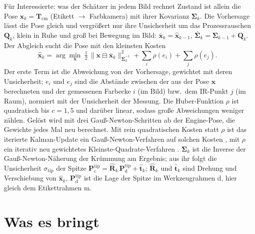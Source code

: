\documentclass[11pt,a4paper,fleqn]{article}
\newcommand{\Tcm}{\mathbf{T}_{\mathrm{cm}}}
\newcommand{\Ptd}{\mathbf{P}^{\mathrm{tip}}_{\mathrm{d}}}
\newcommand{\Ptc}{\mathbf{P}^{\mathrm{tip}}_{\mathrm{c}}}
\newcommand{\stip}{\sigma_{\mathrm{tip}}}
\newcommand{\xb}{\bar{\mathbf{x}}_k}
\newcommand{\xh}{\hat{\mathbf{x}}}
\newcommand{\Sb}{\bar{\boldsymbol{\Sigma}}_k}
\begin{document}
\begin{mybox}{Für Interessierte: was der Schätzer in jedem Bild rechnet}
Zustand ist allein die Pose $\mathbf{x}_k = \Tcm$ (Etikett $\to$ Farbkamera) mit ihrer Kovarianz
$\boldsymbol{\Sigma}_k$. Die Vorhersage
lässt die Pose gleich und vergrößert nur ihre Unsicherheit um das Prozessrauschen $\mathbf{Q}_k$, klein in Ruhe
und groß bei Bewegung im Bild: $\xb = \xh_{k-1}$, $\Sb = \boldsymbol{\Sigma}_{k-1} + \mathbf{Q}_k$. Der Abgleich
sucht die Pose mit den kleinsten Kosten
\begin{equation*}
  \xh_k = \arg\min_{\mathbf{x}}\;
  \tfrac12\,\bigl\lVert \mathbf{x} \boxminus \xb \bigr\rVert^2_{\Sb^{-1}}
  + \sum_i \rho(e_i) + \sum_j \rho(e_j) .
\end{equation*}
Der erste Term ist die Abweichung von der Vorhersage, gewichtet mit deren Unsicherheit; $e_i$ und $e_j$ sind die
Abstände zwischen der aus der Pose $\mathbf{x}$ berechneten und der gemessenen Farbecke $i$ (im Bild) bzw.\ dem
IR-Punkt $j$ (im Raum), normiert mit der Unsicherheit der Messung. Die Huber-Funktion $\rho$ ist quadratisch bis
$c = 1{,}5$ und darüber linear, sodass große Abweichungen weniger zählen. Gelöst wird mit drei
Gauß-Newton-Schritten ab der Engine-Pose, die Gewichte jedes Mal neu berechnet. Mit rein quadratischen Kosten
statt $\rho$ ist das iterierte Kalman-Update ein Gauß-Newton-Verfahren auf solchen Kosten
\cite{bell1993iterated}, mit $\rho$ ein iterativ neu gewichtetes Kleinste-Quadrate-Verfahren
\cite[§9.4]{zhang1997parameter}. $\boldsymbol{\Sigma}_k$ ist die Inverse der Gauß-Newton-Näherung der Krümmung am
Ergebnis; aus ihr folgt die Unsicherheit $\stip$ der Spitze $\Ptc = \hat{\mathbf{R}}_k\,\Ptd + \hat{\mathbf{t}}_k$;
$\hat{\mathbf{R}}_k$ und $\hat{\mathbf{t}}_k$ sind Drehung und Verschiebung von $\xh_k$, $\Ptd$ ist die Lage der
Spitze im Werkzeugrahmen d, hier gleich dem Etikettrahmen m.
\end{mybox}

\section{Was es bringt}
\label{sec:ergebnis}
\end{document}
